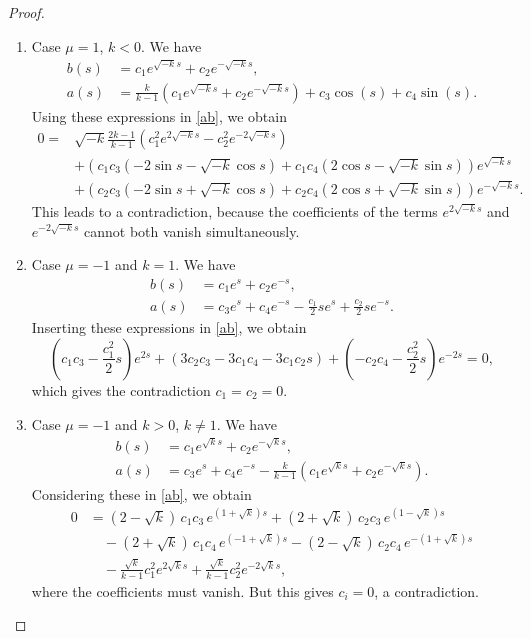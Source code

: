 \documentclass[a4paper,12pt]{amsart}
\theoremstyle{definition}
\begin{document}
\begin{proof}
\begin{enumerate}
\begin{enumerate}
\begin{enumerate}
\item Case $\mu=1$, $k <0$. We have 
\begin{equation*}
\begin{split}
b(s)&=c_1e^{\sqrt{-k}s}+c_2 e^{-\sqrt{-k}s},\\ 
a(s)&=\frac{k }{k-1}(c_1 e^{\sqrt{-k} s}+c_2 e^{-\sqrt{-k} s})+c_3 \cos (s)+c_4 \sin (s).
\end{split}
\end{equation*}
Using these expressions in \eqref{ab}, we obtain 
$$
\begin{aligned}
0=&
\sqrt{-k}\frac{2k-1}{k-1}( c_1^{2} e^{2\sqrt{-k}s}-c_2^{2} e^{-2\sqrt{-k}s}) \\
&+(c_1c_3(-2\sin s - \sqrt{-k}\cos s)+c_1c_4(2\cos s - \sqrt{-k}\sin s)) e^{\sqrt{-k}s} \\
&+(c_2c_3(-2\sin s +\sqrt{-k}\cos s)+c_2c_4(2\cos s + \sqrt{-k}\sin s))e^{-\sqrt{-k}s}.
\end{aligned}
$$
This leads to a contradiction, because the coefficients of the terms $e^{2\sqrt{-k}s}$ and $e^{-2\sqrt{-k}s}$ cannot both vanish simultaneously.

\item Case $\mu=-1$ and $k=1$. We have 
\begin{equation*}
\begin{split}
b(s)&=c_1e^s+c_2 e^{-s},\\
a(s) &= c_3 e^s + c_4  e^{-s} - \frac{c_1}{2} s e^s + \frac{c_2}{2} s e^{-s}.
\end{split}
\end{equation*}
Inserting these expressions in \eqref{ab}, we obtain
$$
(c_1 c_3 - \frac{c_1^2}{2}  s ) e^{2s}
+( 3c_2 c_3 - 3c_1 c_4 - 3c_1 c_2 s )
+ ( -c_2 c_4 - \frac{c_2^2}{2}  s ) e^{-2s}=0,
$$
which gives the contradiction $c_1=c_2=0$.

\item Case $\mu=-1$ and $k>0$, $k\neq 1$. We have
\begin{equation*}
\begin{split}
b(s)&=c_1e^{\sqrt{k}s}+c_2 e^{-{\sqrt{k}s}},\\
a(s)&= c_3e^{s} + c_4e^{-s}- \frac{k}{k-1}( c_1e^{\sqrt{k}s} + c_2e^{-\sqrt{k}s} ).
\end{split}
\end{equation*}
Considering these in \eqref{ab}, we obtain
$$
\begin{aligned}
0 &= (2 - \sqrt{k})\,c_1 c_3\, e^{(1+\sqrt{k})s}
+ (2 + \sqrt{k})\,c_2 c_3\, e^{(1-\sqrt{k})s} \\
&\quad - (2 + \sqrt{k})\,c_1 c_4\, e^{(-1+\sqrt{k})s}
- (2 - \sqrt{k})\,c_2 c_4\, e^{-(1+\sqrt{k})s} \\
&\quad - \frac{\sqrt{k}}{k-1} c_1^2 e^{2\sqrt{k} s}
+ \frac{\sqrt{k}}{k-1} c_2^2 e^{-2\sqrt{k} s},
\end{aligned}
$$
where the coefficients must vanish. But this gives  $c_i = 0$, a contradiction.


\end{enumerate}
\end{enumerate}
\end{enumerate}
\end{proof}
\end{document}
